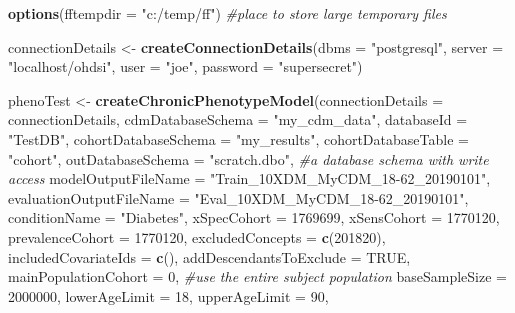 \documentclass[
]{article}
\newenvironment{Shaded}{\begin{snugshade}}{\end{snugshade}}
\newcommand{\CommentTok}[1]{\textcolor[rgb]{0.56,0.35,0.01}{\textit{#1}}}
\newcommand{\DataTypeTok}[1]{\textcolor[rgb]{0.13,0.29,0.53}{#1}}
\newcommand{\DecValTok}[1]{\textcolor[rgb]{0.00,0.00,0.81}{#1}}
\newcommand{\KeywordTok}[1]{\textcolor[rgb]{0.13,0.29,0.53}{\textbf{#1}}}
\newcommand{\NormalTok}[1]{#1}
\newcommand{\OtherTok}[1]{\textcolor[rgb]{0.56,0.35,0.01}{#1}}
\newcommand{\StringTok}[1]{\textcolor[rgb]{0.31,0.60,0.02}{#1}}
\begin{document}
\begin{Shaded}
\begin{Highlighting}[]
\KeywordTok{options}\NormalTok{(}\DataTypeTok{fftempdir =} \StringTok{"c:/temp/ff"}\NormalTok{) }\CommentTok{#place to store large temporary files}

\NormalTok{connectionDetails <-}\StringTok{ }\KeywordTok{createConnectionDetails}\NormalTok{(}\DataTypeTok{dbms =} \StringTok{"postgresql"}\NormalTok{,}
                                              \DataTypeTok{server =} \StringTok{"localhost/ohdsi"}\NormalTok{,}
                                              \DataTypeTok{user =} \StringTok{"joe"}\NormalTok{,}
                                              \DataTypeTok{password =} \StringTok{"supersecret"}\NormalTok{)}

\NormalTok{phenoTest <-}\StringTok{ }\KeywordTok{createChronicPhenotypeModel}\NormalTok{(}\DataTypeTok{connectionDetails =}\NormalTok{ connectionDetails,}
                \DataTypeTok{cdmDatabaseSchema =} \StringTok{"my_cdm_data"}\NormalTok{,}
                \DataTypeTok{databaseId =} \StringTok{"TestDB"}\NormalTok{,}
                \DataTypeTok{cohortDatabaseSchema =} \StringTok{"my_results"}\NormalTok{,}
                \DataTypeTok{cohortDatabaseTable =} \StringTok{"cohort"}\NormalTok{,}
                \DataTypeTok{outDatabaseSchema =} \StringTok{"scratch.dbo"}\NormalTok{, }\CommentTok{#a database schema with write access}
                \DataTypeTok{modelOutputFileName =} \StringTok{"Train_10XDM_MyCDM_18-62_20190101"}\NormalTok{,}
                \DataTypeTok{evaluationOutputFileName =} \StringTok{"Eval_10XDM_MyCDM_18-62_20190101"}\NormalTok{,}
                \DataTypeTok{conditionName =} \StringTok{"Diabetes"}\NormalTok{,}
                \DataTypeTok{xSpecCohort =} \DecValTok{1769699}\NormalTok{,}
                \DataTypeTok{xSensCohort =} \DecValTok{1770120}\NormalTok{,}
                \DataTypeTok{prevalenceCohort =} \DecValTok{1770120}\NormalTok{,}
                \DataTypeTok{excludedConcepts =} \KeywordTok{c}\NormalTok{(}\DecValTok{201820}\NormalTok{), }
                \DataTypeTok{includedCovariateIds =} \KeywordTok{c}\NormalTok{(),}
                \DataTypeTok{addDescendantsToExclude =} \OtherTok{TRUE}\NormalTok{,}
                \DataTypeTok{mainPopulationCohort =} \DecValTok{0}\NormalTok{, }\CommentTok{#use the entire subject population}
                \DataTypeTok{baseSampleSize =} \DecValTok{2000000}\NormalTok{,}
                \DataTypeTok{lowerAgeLimit =} \DecValTok{18}\NormalTok{, }
                \DataTypeTok{upperAgeLimit =} \DecValTok{90}\NormalTok{,}

\end{Highlighting}
\end{Shaded}
\end{document}
